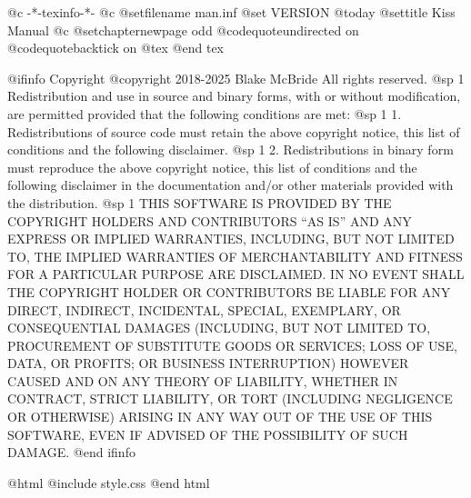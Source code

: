     @c -*-texinfo-*-
@c %
@setfilename man.inf
@set VERSION @today
@settitle Kiss Manual
@c %
@setchapternewpage odd
@codequoteundirected on
@codequotebacktick on
@tex
\global\def\linkcolor{0 0 1}  %
\global\def\urlcolor{0 0 1}   %
@end tex

@ifinfo
Copyright  @copyright{} 2018-2025 Blake McBride
All rights reserved.
@sp 1
Redistribution and use in source and binary forms, with or without
modification, are permitted provided that the following conditions are
met:
@sp 1
1. Redistributions of source code must retain the above copyright
notice, this list of conditions and the following disclaimer.
@sp 1
2. Redistributions in binary form must reproduce the above copyright
notice, this list of conditions and the following disclaimer in the
documentation and/or other materials provided with the distribution.
@sp 1
THIS SOFTWARE IS PROVIDED BY THE COPYRIGHT HOLDERS AND CONTRIBUTORS
``AS IS'' AND ANY EXPRESS OR IMPLIED WARRANTIES, INCLUDING, BUT NOT
LIMITED TO, THE IMPLIED WARRANTIES OF MERCHANTABILITY AND FITNESS FOR
A PARTICULAR PURPOSE ARE DISCLAIMED. IN NO EVENT SHALL THE COPYRIGHT
HOLDER OR CONTRIBUTORS BE LIABLE FOR ANY DIRECT, INDIRECT, INCIDENTAL,
SPECIAL, EXEMPLARY, OR CONSEQUENTIAL DAMAGES (INCLUDING, BUT NOT
LIMITED TO, PROCUREMENT OF SUBSTITUTE GOODS OR SERVICES; LOSS OF USE,
DATA, OR PROFITS; OR BUSINESS INTERRUPTION) HOWEVER CAUSED AND ON ANY
THEORY OF LIABILITY, WHETHER IN CONTRACT, STRICT LIABILITY, OR TORT
(INCLUDING NEGLIGENCE OR OTHERWISE) ARISING IN ANY WAY OUT OF THE USE
OF THIS SOFTWARE, EVEN IF ADVISED OF THE POSSIBILITY OF SUCH DAMAGE.
@end ifinfo

@html
@include style.css
@end html

